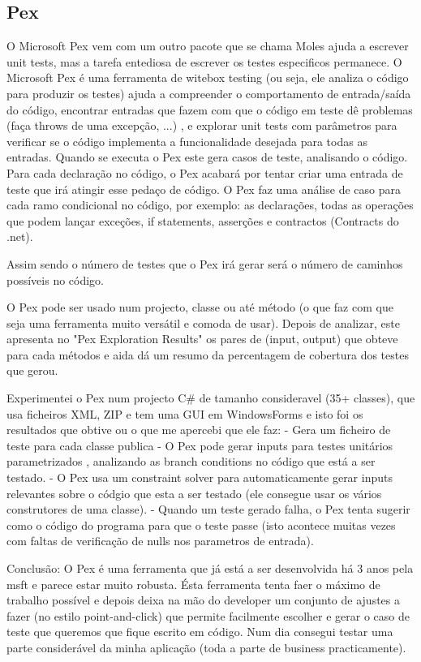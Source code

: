 \documentclass[citeauthoryear]{llncs}
\begin{document}
\subsection{Pex}
O Microsoft Pex vem com um outro pacote que se chama Moles ajuda a escrever unit tests, mas a tarefa entediosa de escrever os testes especificos permanece. 
O Microsoft Pex é uma ferramenta de witebox testing (ou seja, ele analiza o código para produzir os testes) ajuda a compreender o comportamento de entrada/saída do código, encontrar entradas que fazem com que o código em teste dê problemas (faça throws de uma excepção, ...) , e explorar unit tests com parâmetros para verificar se o código implementa a funcionalidade desejada para todas as entradas.
Quando se executa o Pex este gera casos de teste, analisando o código. Para cada declaração no código, o Pex acabará por tentar criar uma entrada de teste que irá atingir esse pedaço de código.
O Pex faz uma análise de caso para cada ramo condicional no código, por exemplo: as declarações, todas as operações que podem lançar exceções, if statements, asserções e contractos (Contracts do .net).

Assim sendo o número de testes que o Pex irá gerar será o número de caminhos possíveis no código.

O Pex pode ser usado num projecto, classe ou até método (o que faz com que seja uma ferramenta muito versátil e comoda de usar). Depois de analizar, este apresenta no "Pex Exploration Results" os pares de (input, output) que obteve para cada métodos e aida dá um resumo da percentagem de cobertura dos testes que gerou.

Experimentei o Pex num projecto C\# de tamanho consideravel (35+ classes), que usa ficheiros XML, ZIP e tem uma GUI em WindowsForms e isto foi os resultados que obtive ou o que me apercebi que ele faz:
- Gera um ficheiro de teste para cada classe publica
- O Pex pode gerar inputs para testes unitários parametrizados , analizando as branch conditions no código que está a ser testado.
- O Pex usa um constraint solver para automaticamente gerar inputs relevantes sobre o códgio que esta a ser testado (ele consegue usar os vários construtores de uma classe).
- Quando um teste gerado falha, o Pex tenta sugerir como o código do programa para que o teste passe (isto acontece muitas vezes com faltas de verificação de nulls nos parametros de entrada).

Conclusão: O Pex é uma ferramenta que já está a ser desenvolvida há 3 anos pela msft e parece estar muito robusta. Ésta ferramenta tenta faer o máximo de trabalho possível e depois deixa na mão do developer um conjunto de ajustes a fazer (no estilo point-and-click) que permite facilmente escolher e gerar o caso de teste que queremos que fique escrito em código.
Num dia consegui testar uma parte considerável da minha aplicação (toda a parte de business practicamente).




\end{document}
